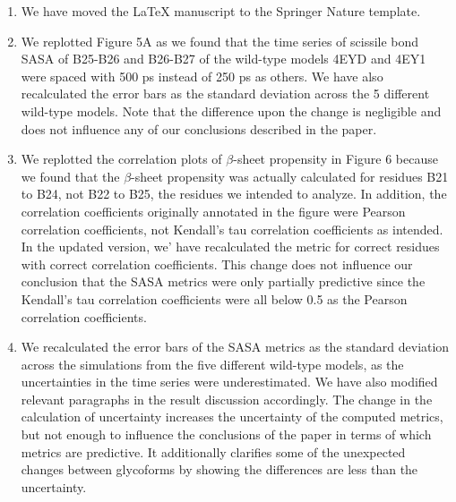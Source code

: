 \documentclass[sn-vancouver]{sn-jnl}
\begin{document}
\begin{enumerate}
\item We have moved the LaTeX manuscript to the Springer Nature template.
\item We replotted Figure 5A as we found that the time series of scissile bond SASA of B25-B26 and B26-B27 of the wild-type models 4EYD and 4EY1 were spaced with 500 ps instead of 250 ps as others. We have also recalculated the error bars as the standard deviation across the 5 different wild-type models. Note that the difference upon the change is negligible and does not influence any of our conclusions described in the paper.
\item We replotted the correlation plots of $\beta$-sheet propensity in Figure 6 because we found that the $\beta$-sheet propensity was actually calculated for residues B21 to B24, not B22 to B25, the residues we intended to analyze. In addition, the correlation coefficients originally annotated in the figure were Pearson correlation coefficients, not Kendall's tau correlation coefficients as intended. In the updated version, we' have recalculated the metric for correct residues with correct correlation coefficients. This change does not influence our conclusion that the SASA metrics were only partially predictive since the Kendall's tau correlation coefficients were all below 0.5 as the Pearson correlation coefficients. 
\item We recalculated the error bars of the SASA metrics as the standard deviation across the simulations from the five different wild-type models, as the uncertainties in the time series were underestimated. We have also modified relevant paragraphs in the result discussion accordingly. The change in the calculation of uncertainty increases the uncertainty of the computed metrics, but not enough to influence the conclusions of the paper in terms of which metrics are predictive. It additionally clarifies some of the unexpected changes between glycoforms by showing the differences are less than the uncertainty. 

\end{enumerate}
\end{document}
